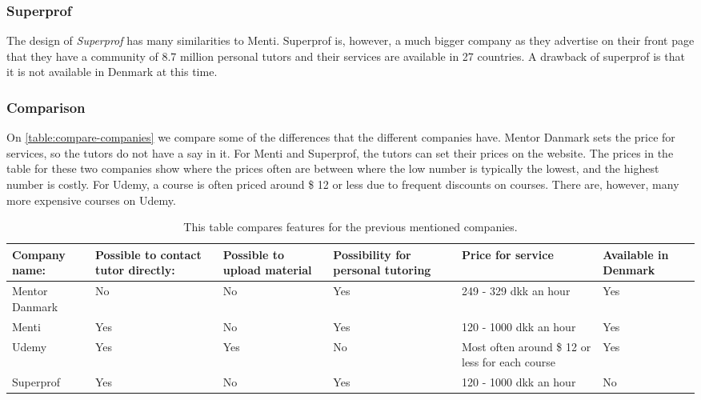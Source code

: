 \subsubsection{Superprof}
The design of \textit{Superprof} has many similarities to Menti.
Superprof is, however, a much bigger company as they advertise on their front page that they have a community of 8.7 million personal tutors \cite{superprof} and their services are available in 27 countries.
A drawback of superprof is that it is not available in Denmark at this time.

\subsubsection{Comparison}
On \autoref{table:compare-companies} we compare some of the differences that the different companies have.
Mentor Danmark sets the price for services, so the tutors do not have a say in it.
For Menti and Superprof, the tutors can set their prices on the website. 
The prices in the table for these two companies show where the prices often are between where the low number is typically the lowest, and the highest number is costly.
For Udemy, a course is often priced around \$ 12 or less due to frequent discounts on courses.
There are, however, many more expensive courses on Udemy.

\begin{table}[h]
    \begin{tabular}{|p{2cm}|p{2cm}|p{2cm}|p{2cm}|p{2cm}|p{2cm}|}
    \hline
    Company name:  & Possible to contact tutor directly: & Possible to upload material & Possibility for personal tutoring & Price for service                               & Available in Denmark \\ \hline
    Mentor Danmark & No                                  & No                          & Yes                               & 249 - 329 dkk an hour                           & Yes                  \\ \hline
    Menti          & Yes                                 & No                          & Yes                               & 120 - 1000 dkk an hour                          & Yes                  \\ \hline
    Udemy          & Yes                                 & Yes                         & No                                & Most often around \$ 12 or less for each course & Yes                  \\ \hline
    Superprof      & Yes                                 & No                          & Yes                               & 120 - 1000 dkk an hour                          & No                   \\ \hline
    \end{tabular}
    \caption{This table compares features for the previous mentioned companies.}
    \label{table:compare-companies}
\end{table}
 